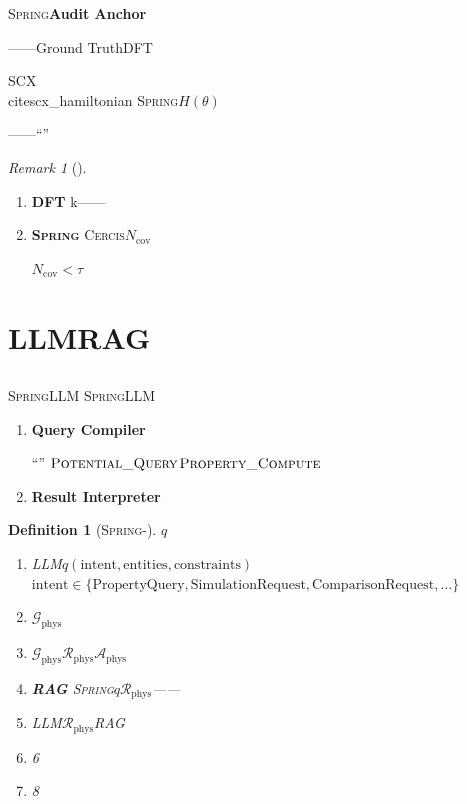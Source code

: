 \documentclass[12pt,a4paper]{article}
\newtheorem{definition}[theorem]{Definition}
\theoremstyle{remark}
\newtheorem{remark}[theorem]{Remark}
\newcommand{\A}{\mathcal{A}}
\newcommand{\Spring}{\textsc{Spring}}
\newcommand{\Cercis}{\textsc{Cercis}}
\begin{document}
\Spring{}\textbf{Audit Anchor}

\textbf{}——Ground TruthDFT
\textit{}

SCX~\\cite{scx_hamiltonian}
\Spring{}$H(\theta)$

——“”


\begin{remark}[]

\begin{enumerate}[label=(\arabic*),nosep]
    \item \textbf{DFT} k——
    
    \item \textbf{\Spring{}} \Cercis{}$N_{\text{cov}}$
    
    $N_{\text{cov}} < \tau$
\end{enumerate}
\end{remark}

\newpage

\section{LLMRAG}

\subsection{}

\Spring{}LLM
\Spring{}LLM\textbf{}


\begin{enumerate}[label=(\arabic*),itemsep=3pt]
    \item \textbf{Query Compiler}
    
    “”
    $\textsc{Potential\_Query}$$\textsc{Property\_Compute}$
    
    \item \textbf{Result Interpreter}
    
    
\end{enumerate}

\begin{definition}[\Spring{}-]\label{def:reasoning_cycle}
$q$
\begin{enumerate}[label= \arabic*,leftmargin=*,itemsep=2pt]
    \item \textbf{} LLM$q$$(\text{intent}, \text{entities}, \text{constraints})$
    $\text{intent} \in \{\text{PropertyQuery}, \text{SimulationRequest}, \text{ComparisonRequest}, \ldots\}$
    \item \textbf{} $\mathcal{G}_{\text{phys}}$
    \item \textbf{} $\mathcal{G}_{\text{phys}}$$\mathcal{R}_{\text{phys}}$$\A_{\text{phys}}$
    \item \textbf{RAG} \Spring{}$q$$\mathcal{R}_{\text{phys}}$——
    
    \item \textbf{} LLM$\mathcal{R}_{\text{phys}}$RAG
    \item \textbf{} 6
    \item \textbf{} 8
\end{enumerate}
\end{definition}
\end{document}
